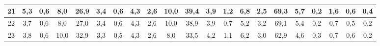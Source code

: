 \begin{sidewaystable}[]
\begin{tabular}{|c|c|c|c|c|c|c|c|c|c|c|c|c|c|c|c|c|c|c|c|c|}
    21 &  5,3                                              & 0,6                                              & 8,0                                              & 26,9                                             & 3,4                                              & 0,6                                              & 4,3                                              & 2,6                                              & 10,0                                             & 39,4                                             & 3,9                                              & 1,2                                              & 6,8                                              & 2,5                                              & 69,3                                             & 5,7                                              & 0,2                                              & 1,6                                              & 0,6                                              & 0,4                                              \\ \hline
    22 &  3,7                                              & 0,6                                              & 8,0                                              & 27,0                                             & 3,4                                              & 0,6                                              & 4,3                                              & 2,6                                              & 10,0                                             & 38,9                                             & 3,9                                              & 0,7                                              & 5,2                                              & 3,2                                              & 69,1                                             & 5,4                                              & 0,2                                              & 0,7                                              & 0,5                                              & 0,2                                              \\ \hline
    23 &  3,8                                              & 0,6                                              & 10,0                                             & 32,9                                             & 3,3                                              & 0,5                                              & 4,3                                              & 2,6                                              & 8,0                                              & 33,5                                             & 4,2                                              & 1,1                                              & 6,2                                              & 3,0                                              & 62,9                                             & 4,6                                              & 0,3                                              & 0,7                                              & 0,6                                              & 0,2                                              \\ \hline

\end{tabular}
\end{sidewaystable}
